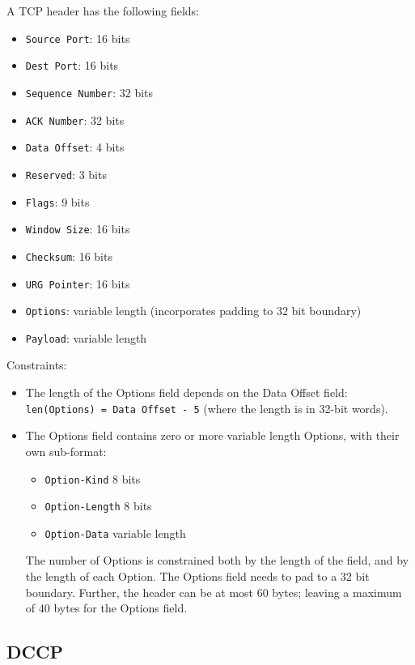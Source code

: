 \documentclass[10pt,a4paper]{article}
\begin{document}
A TCP header has the following fields:
\begin{itemize}
\item \texttt{Source Port}: 16 bits
\item \texttt{Dest Port}: 16 bits
\item \texttt{Sequence Number}: 32 bits
\item \texttt{ACK Number}: 32 bits
\item \texttt{Data Offset}: 4 bits
\item \texttt{Reserved}: 3 bits
\item \texttt{Flags}: 9 bits
\item \texttt{Window Size}: 16 bits
\item \texttt{Checksum}: 16 bits
\item \texttt{URG Pointer}: 16 bits
\item \texttt{Options}: variable length (incorporates padding to 32 bit boundary)
\item \texttt{Payload}: variable length
\end{itemize}

Constraints:
\begin{itemize}
\item The length of the Options field depends on the Data Offset field:
\texttt{len(Options) = Data Offset - 5} (where the length is in 32-bit words).
\item The Options field contains zero or more variable length Options, with their own
sub-format:
\begin{itemize}
\item \texttt{Option-Kind} 8 bits
\item \texttt{Option-Length} 8 bits
\item \texttt{Option-Data} variable length
\end{itemize}
The number of Options is constrained both by the length of the field, and by the length
of each Option. The Options field needs to pad to a 32 bit boundary. Further, the header
can be at most 60 bytes; leaving a maximum of 40 bytes for the Options field.
\end{itemize}

\subsection{DCCP}
\end{document}

